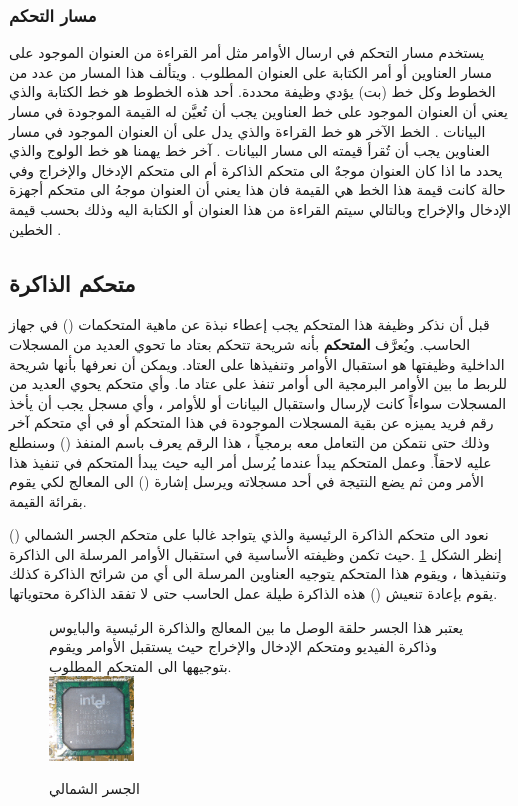\documentclass[document.tex]{subfiles}
\begin{document}
\subsubsection{مسار التحكم }
يستخدم مسار التحكم في ارسال الأوامر مثل أمر القراءة من العنوان الموجود على مسار العناوين أو أمر الكتابة على العنوان المطلوب . ويتألف هذا المسار من عدد من الخطوط وكل خط (بت) يؤدي وظيفة محددة. أحد هذه الخطوط هو خط الكتابة  والذي يعني أن العنوان الموجود على خط العناوين يجب أن تُعيَّن له القيمة الموجودة في مسار البيانات . الخط الآخر هو خط القراءة  والذي يدل على أن العنوان الموجود في مسار العناوين يجب أن تُقرأ قيمته الى مسار البيانات . آخر خط يهمنا هو خط الولوج  والذي يحدد ما اذا كان العنوان موجهٌ الى متحكم الذاكرة أم الى متحكم  الإدخال والإخراج وفي حالة كانت قيمة هذا الخط هي القيمة  فان هذا يعني أن العنوان موجهُ الى متحكم أجهزة الإدخال والإخراج وبالتالي سيتم القراءة من هذا العنوان أو الكتابة اليه وذلك بحسب قيمة الخطين .

\subsection{متحكم الذاكرة}
قبل أن نذكر وظيفة هذا المتحكم يجب إعطاء نبذة عن ماهية المتحكمات () في جهاز الحاسب. ويُعرَّف \textbf{المتحكم} بأنه شريحة تتحكم بعتاد ما تحوي العديد من المسجلات الداخلية وظيفتها هو استقبال الأوامر وتنفيذها على العتاد. ويمكن أن نعرفها بأنها شريحة للربط ما بين الأوامر البرمجية الى أوامر تنفذ على عتاد ما. وأي متحكم يحوي العديد من المسجلات سواءاً كانت لإرسال واستقبال البيانات أو للأوامر ، وأي مسجل يجب أن يأخذ رقم فريد يميزه عن بقية المسجلات الموجودة في هذا المتحكم أو في أي متحكم آخر وذلك حتى نتمكن من التعامل معه برمجياً ، هذا الرقم يعرف باسم المنفذ () وسنطلع عليه لاحقاً. وعمل المتحكم يبدأ عندما يُرسل أمر اليه حيث يبدأ المتحكم في تنفيذ هذا الأمر ومن ثم يضع النتيجة في أحد مسجلاته ويرسل إشارة () الى المعالج لكي يقوم بقرائة القيمة.

نعود الى متحكم الذاكرة الرئيسية والذي يتواجد غالبا على متحكم الجسر الشمالي () إنظر الشكل \ref{fig:nbridge} .حيث تكمن وظيفته الأساسية في استقبال الأوامر المرسلة الى الذاكرة وتنفيذها ، ويقوم هذا المتحكم يتوجيه العناوين المرسلة الى أي من شرائح الذاكرة كذلك يقوم بإعادة تنعيش () هذه الذاكرة طيلة عمل الحاسب حتى لا تفقد الذاكرة محتوياتها.

\begin{figure}[h!]
  \caption{الجسر الشمالي}
 {يعتبر هذا الجسر حلقة الوصل ما بين المعالج والذاكرة الرئيسية والبايوس وذاكرة الفيديو ومتحكم الإدخال والإخراج حيث يستقبل الأوامر ويقوم بتوجيهها الى المتحكم المطلوب.}
\\
  \centering
   \includegraphics[width=0.2\textwidth]{../img/nbridge}
  \label{fig:nbridge} 
\end{figure}
\end{document}
